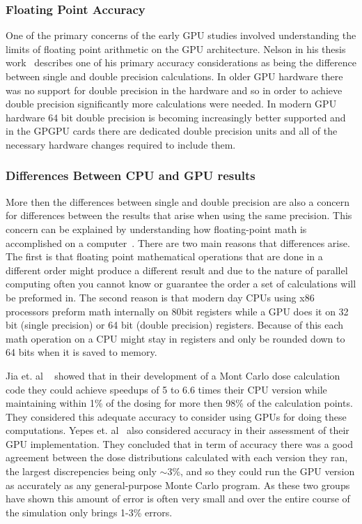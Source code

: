 \subsubsection*{\textbf{Floating Point Accuracy} }

One of the primary concerns of the early GPU studies involved understanding the limits of floating point arithmetic on the GPU architecture.
%
Nelson in his thesis work~\cite{nelson2009monte} describes one of his primary accuracy considerations as being the difference between single and double precision calculations.
%
In older GPU hardware there was no support for double precision in the hardware and so in order to achieve double precision significantly more calculations were needed.
%
In modern GPU hardware 64 bit double precision is becoming increasingly better supported and in the GPGPU cards there are dedicated double precision units and all of the necessary hardware changes required to include them.
%

\subsubsection*{\textbf{Differences Between CPU and GPU results} }

More then the differences between single and double precision are also a concern for differences between the results that arise when using the same precision.
%
This concern can be explained by understanding how floating-point math is accomplished on a computer~\cite{goldberg1991every}.
%
There are two main reasons that differences arise.
%
The first is that floating point mathematical operations that are done in a different order might produce a different result and due to the nature of parallel computing often you cannot know or guarantee the order a set of calculations will be preformed in.
%
The second reason is that modern day CPUs using x86 processors preform math internally on 80bit registers while a GPU does it on 32 bit (single precision) or 64 bit (double precision) registers.
%
Because of this each math operation on a CPU might stay in registers and only be rounded down to 64 bits when it is saved to memory.
%

%
Jia et. al ~\cite{jia2010development} showed that in their development of a Mont Carlo dose calculation code they could achieve speedups of 5 to 6.6 times their CPU version while maintaining within 1\% of the dosing for more then 98\% of the calculation points.
%
They considered this adequate accuracy to consider using GPUs for doing these computations.
%
Yepes et. al~\cite{yepes2010gpu} also considered accuracy in their assessment of their GPU implementation.
%
They concluded that in term of accuracy there was a good agreement between the dose distributions calculated with each version they ran, the largest discrepencies being only $\sim$3\%, and so they could run the GPU version as accurately as any general-purpose Monte Carlo program.
%
As these two groups have shown this amount of error is often very small and over the entire course of the simulation only brings 1-3\% errors.

